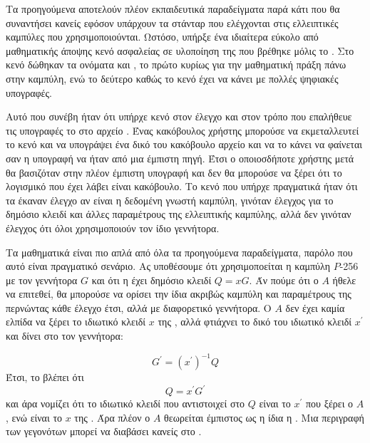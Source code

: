 \documentclass[oneside,a4paper]{article}
\begin{document}
Τα προηγούμενα  αποτελούν πλέον εκπαιδευτικά παραδείγματα παρά κάτι που θα συναντήσει κανείς εφόσον υπάρχουν τα στάνταρ που ελέγχονται στις ελλειπτικές καμπύλες που χρησιμοποιούνται. Ωστόσο, υπήρξε ένα ιδιαίτερα εύκολο από μαθηματικής άποψης κενό ασφαλείας σε υλοποίηση της  που βρέθηκε μόλις το . Στο κενό δώθηκαν τα ονόματα  και , το πρώτο κυρίως για την μαθηματική πράξη πάνω στην καμπύλη, ενώ το δεύτερο καθώς το κενό έχει να κάνει με πολλές ψηφιακές υπογραφές.


Αυτό που συνέβη ήταν ότι υπήρχε κενό στον έλεγχο και στον τρόπο που επαλήθευε τις  υπογραφές το  στο αρχείο . Ένας κακόβουλος χρήστης μπορούσε να εκμεταλλευτεί το κενό και να υπογράψει ένα δικό του κακόβουλο αρχείο και να το κάνει να φαίνεται σαν η υπογραφή να ήταν από μια έμπιστη πηγή. Έτσι ο οποιοσδήποτε χρήστης μετά θα βασιζόταν στην πλέον έμπιστη υπογραφή και δεν θα μπορούσε να ξέρει ότι το λογισμικό που έχει λάβει είναι κακόβουλο. Το κενό που υπήρχε πραγματικά ήταν ότι τα  έκαναν έλεγχο αν είναι η δεδομένη γνωστή καμπύλη, γινόταν έλεγχος για το δημόσιο κλειδί και άλλες παραμέτρους της ελλειπτικής καμπύλης, αλλά δεν γινόταν έλεγχος ότι όλοι χρησιμοποιούν τον ίδιο γεννήτορα. 

Τα μαθηματικά είναι πιο απλά από όλα τα προηγούμενα παραδείγματα, παρόλο που αυτό είναι πραγματικό σενάριο. Ας υποθέσουμε ότι χρησιμοποείται η καμπύλη $P$-256 με τον γεννήτορα $G$ και ότι η  έχει δημόσιο κλειδί $Q = xG$. Άν πούμε ότι ο $A$ ήθελε να επιτεθεί, θα μπορούσε να ορίσει την ίδια ακριβώς καμπύλη και παραμέτρους της περνώντας κάθε έλεγχο έτσι, αλλά με διαφορετικό γεννήτορα. Ο $A$ δεν έχει καμία ελπίδα να ξέρει το ιδιωτικό κλειδί $x$ της , αλλά φτιάχνει το δικό του ιδιωτικό κλειδί $x^{\prime}$ και δίνει στο  τον γεννήτορα:

$$G^{\prime} = (x^{\prime})^{-1} Q$$
Έτσι, το  βλέπει ότι
$$Q = x^{\prime} G^{\prime}$$ και άρα νομίζει ότι το ιδιωτικό κλειδί που αντιστοιχεί στο $Q$ είναι το $x^{\prime}$ που ξέρει ο $A$, ενώ είναι το $x$ της . Άρα πλέον ο $A$ θεωρείται έμπιστος ως η ίδια η . Μια περιγραφή των γεγονότων μπορεί να διαβάσει κανείς στο .
\end{document}
